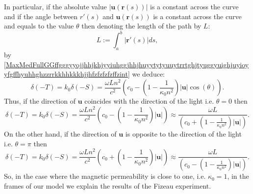 \documentclass{article}
\theoremstyle{definition}
\theoremstyle{remark}
\renewcommand{\vec}[1]{\mathbf{#1}}
\newcommand{\er}{\eqref}
\newcommand{\er}{\eqref}
\begin{document}
In particular, if the absolute value $\left|\vec u\left(\vec
r(s)\right)\right|$ is a constant across the curve and if the angle
between $r'(s)$ and $\vec u\left(\vec r(s)\right)$ is a constant
across the curve and equals to the value $\theta$ then denoting the
length of the path by $L$:
\begin{equation}\label{MaxMedFullGGffgggyyojjhhjkhjyyiuhggjhhjhuyytytyuuytrrtghjtyuggyuighjuyioyyfgffhyuhhghzzrrkkhhkkkhjjhjjfzuyyint}
L:=\int_a^b \left|\vec r'(s)\right|ds,
\end{equation}
by
\er{MaxMedFullGGffgggyyojjhhjkhjyyiuhggjhhjhuyytytyuuytrrtghjtyuggyuighjuyioyyfgffhyuhhghzzrrkkhhkkkhjjhfzfzfzfzffzint}
we deduce:
\begin{equation}\label{MaxMedFullGGffgggyyojjhhjkhjyyiuhggjhhjhuyytytyuuytrrtghjtyuggyuighjuyioyyfgffhyuhhghzzrrkkhhkkkhjjhfzfzfzfzffzghghgfzint}
\delta(-T)=k_0\delta(-S)=\frac{\omega L
n^2}{c^2}\left(c_0-\left(1-\frac{1}{\kappa_0n^2}\right)|\vec
u|\cos{(\theta)}\right).
\end{equation}
Thus, if the direction of $\vec u$ coincides with the direction of
the light i.e. $\theta=0$ then
\begin{equation}\label{MaxMedFullGGffgggyyojjhhjkhjyyiuhggjhhjhuyytytyuuytrrtghjtyuggyuighjuyioyyfgffhyuhhghzzrrkkhhkkkhjjhfzfzfzfzffzghghgfzytyfzint}
\delta(-T)=k_0\delta(-S)=\frac{\omega L
n^2}{c^2}\left(c_0-\left(1-\frac{1}{\kappa_0n^2}\right)|\vec
u|\right)\approx\frac{\omega
L}{\left(c_0+\left(1-\frac{1}{\kappa_0n^2}\right)|\vec u|\right)}.
\end{equation}
On the other hand, if the direction of $\vec u$ is opposite to the
direction of the light i.e. $\theta=\pi$ then
\begin{equation}\label{MaxMedFullGGffgggyyojjhhjkhjyyiuhggjhhjhuyytytyuuytrrtghjtyuggyuighjuyioyyfgffhyuhhghzzrrkkhhkkkhjjhfzfzfzfzffzghghgfzuyuyhffzint}
\delta(-T)=k_0\delta(-S)=\frac{\omega L
n^2}{c^2}\left(c_0+\left(1-\frac{1}{\kappa_0n^2}\right)|\vec
u|\right)\approx\frac{\omega
L}{\left(c_0-\left(1-\frac{1}{\kappa_0n^2}\right)|\vec u|\right)}.
\end{equation}
So, in the case where the magnetic permeability is close to one,
i.e. $\kappa_0=1$, in the frames of our model we explain the results
of the Fizeau experiment.
\end{document}
